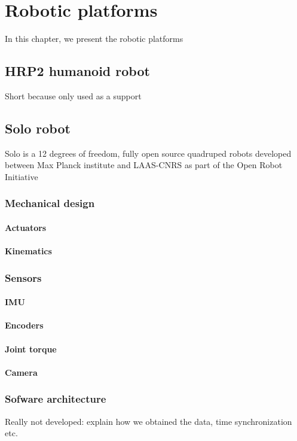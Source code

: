\chapter{Robotic platforms}
\minitoc


In this chapter, we present the robotic platforms

\section{HRP2 humanoid robot}
Short because only used as a support

\section{Solo robot}
Solo is a 12 degrees of freedom, fully open source quadruped robots developed between Max Planck institute and LAAS-CNRS as part of the Open Robot Initiative 
\cite{grimminger2020open} 

\subsection{Mechanical design}
\subsubsection{Actuators}
\subsubsection{Kinematics}

\subsection{Sensors}
\subsubsection{IMU}
\subsubsection{Encoders}
\subsubsection{Joint torque}
\subsubsection{Camera}

\subsection{Sofware architecture}
Really not developed: explain how we obtained the data, time synchronization etc.


